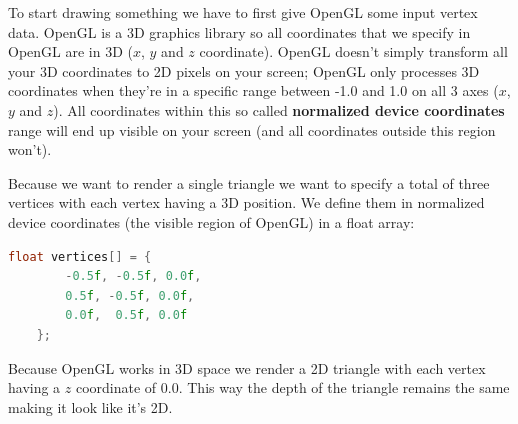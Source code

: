 To start drawing something we have to first give OpenGL some input vertex data. OpenGL is a 3D graphics library so all coordinates that we specify in OpenGL are in 3D ($x$, $y$ and $z$ coordinate). OpenGL doesn't simply transform all your 3D coordinates to 2D pixels on your screen; OpenGL only processes 3D coordinates when they're in a specific range between -1.0 and 1.0 on all 3 axes ($x$, $y$ and $z$). All coordinates within this so called \textbf{normalized device coordinates} range will end up visible on your screen (and all coordinates outside this region won't).

Because we want to render a single triangle we want to specify a total of three vertices with each vertex having a 3D position. We define them in normalized device coordinates (the visible region of OpenGL) in a float array:

\newpage

\begin{lstlisting}[language=C++]
    float vertices[] = {
        -0.5f, -0.5f, 0.0f,
        0.5f, -0.5f, 0.0f,
        0.0f,  0.5f, 0.0f
    };  
\end{lstlisting}

Because OpenGL works in 3D space we render a 2D triangle with each vertex having a $z$ coordinate of 0.0. This way the depth of the triangle remains the same making it look like it's 2D.

